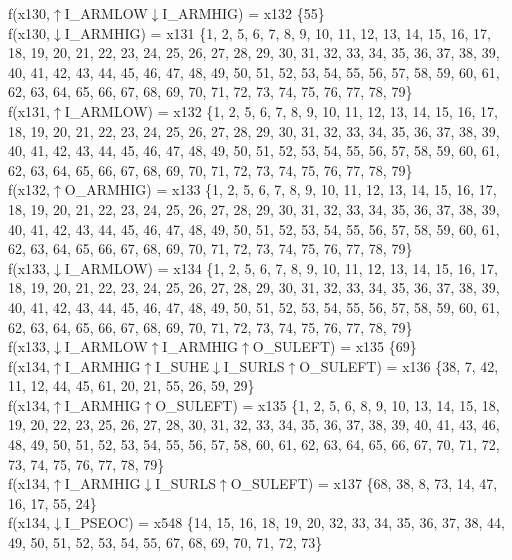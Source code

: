 f(x130,$\uparrow$I\_ARMLOW$\downarrow$I\_ARMHIG) = x132 \{55\} \\  
f(x130,$\downarrow$I\_ARMHIG) = x131 \{1, 2, 5, 6, 7, 8, 9, 10, 11, 12, 13, 14, 15, 16, 17, 18, 19, 20, 21, 22, 23, 24, 25, 26, 27, 28, 29, 30, 31, 32, 33, 34, 35, 36, 37, 38, 39, 40, 41, 42, 43, 44, 45, 46, 47, 48, 49, 50, 51, 52, 53, 54, 55, 56, 57, 58, 59, 60, 61, 62, 63, 64, 65, 66, 67, 68, 69, 70, 71, 72, 73, 74, 75, 76, 77, 78, 79\} \\  
f(x131,$\uparrow$I\_ARMLOW) = x132 \{1, 2, 5, 6, 7, 8, 9, 10, 11, 12, 13, 14, 15, 16, 17, 18, 19, 20, 21, 22, 23, 24, 25, 26, 27, 28, 29, 30, 31, 32, 33, 34, 35, 36, 37, 38, 39, 40, 41, 42, 43, 44, 45, 46, 47, 48, 49, 50, 51, 52, 53, 54, 55, 56, 57, 58, 59, 60, 61, 62, 63, 64, 65, 66, 67, 68, 69, 70, 71, 72, 73, 74, 75, 76, 77, 78, 79\} \\  
f(x132,$\uparrow$O\_ARMHIG) = x133 \{1, 2, 5, 6, 7, 8, 9, 10, 11, 12, 13, 14, 15, 16, 17, 18, 19, 20, 21, 22, 23, 24, 25, 26, 27, 28, 29, 30, 31, 32, 33, 34, 35, 36, 37, 38, 39, 40, 41, 42, 43, 44, 45, 46, 47, 48, 49, 50, 51, 52, 53, 54, 55, 56, 57, 58, 59, 60, 61, 62, 63, 64, 65, 66, 67, 68, 69, 70, 71, 72, 73, 74, 75, 76, 77, 78, 79\} \\  
f(x133,$\downarrow$I\_ARMLOW) = x134 \{1, 2, 5, 6, 7, 8, 9, 10, 11, 12, 13, 14, 15, 16, 17, 18, 19, 20, 21, 22, 23, 24, 25, 26, 27, 28, 29, 30, 31, 32, 33, 34, 35, 36, 37, 38, 39, 40, 41, 42, 43, 44, 45, 46, 47, 48, 49, 50, 51, 52, 53, 54, 55, 56, 57, 58, 59, 60, 61, 62, 63, 64, 65, 66, 67, 68, 69, 70, 71, 72, 73, 74, 75, 76, 77, 78, 79\} \\  
f(x133,$\downarrow$I\_ARMLOW$\uparrow$I\_ARMHIG$\uparrow$O\_SULEFT) = x135 \{69\} \\  
f(x134,$\uparrow$I\_ARMHIG$\uparrow$I\_SUHE$\downarrow$I\_SURLS$\uparrow$O\_SULEFT) = x136 \{38, 7, 42, 11, 12, 44, 45, 61, 20, 21, 55, 26, 59, 29\} \\  
f(x134,$\uparrow$I\_ARMHIG$\uparrow$O\_SULEFT) = x135 \{1, 2, 5, 6, 8, 9, 10, 13, 14, 15, 18, 19, 20, 22, 23, 25, 26, 27, 28, 30, 31, 32, 33, 34, 35, 36, 37, 38, 39, 40, 41, 43, 46, 48, 49, 50, 51, 52, 53, 54, 55, 56, 57, 58, 60, 61, 62, 63, 64, 65, 66, 67, 70, 71, 72, 73, 74, 75, 76, 77, 78, 79\} \\  
f(x134,$\uparrow$I\_ARMHIG$\downarrow$I\_SURLS$\uparrow$O\_SULEFT) = x137 \{68, 38, 8, 73, 14, 47, 16, 17, 55, 24\} \\  
f(x134,$\downarrow$I\_PSEOC) = x548 \{14, 15, 16, 18, 19, 20, 32, 33, 34, 35, 36, 37, 38, 44, 49, 50, 51, 52, 53, 54, 55, 67, 68, 69, 70, 71, 72, 73\} \\  
